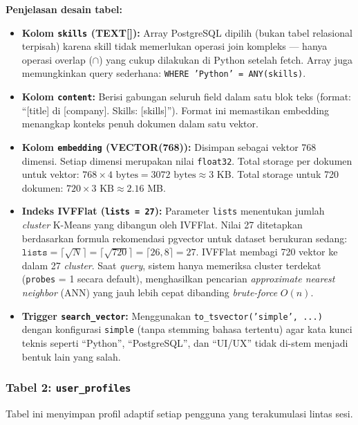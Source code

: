 \noindent \textbf{Penjelasan desain tabel:}
\begin{itemize}
  \item \textbf{Kolom \texttt{skills} (TEXT[]):} Array PostgreSQL dipilih (bukan tabel
    relasional terpisah) karena skill tidak memerlukan operasi join kompleks ---
    hanya operasi overlap ($\cap$) yang cukup dilakukan di Python setelah fetch.
    Array juga memungkinkan query sederhana: \texttt{WHERE 'Python' = ANY(skills)}.
  \item \textbf{Kolom \texttt{content}:} Berisi gabungan seluruh field dalam satu
    blok teks (format: ``[title] di [company]. Skills: [skills]'').
    Format ini memastikan embedding menangkap konteks penuh dokumen dalam satu vektor.
  \item \textbf{Kolom \texttt{embedding} (VECTOR(768)):} Disimpan sebagai vektor
    768 dimensi. Setiap dimensi merupakan nilai \texttt{float32}. Total storage per
    dokumen untuk vektor: $768 \times 4 \text{ bytes} = 3072 \text{ bytes} \approx 3$ KB.
    Total storage untuk 720 dokumen: $720 \times 3 \text{ KB} \approx 2.16$ MB.
  \item \textbf{Indeks IVFFlat (\texttt{lists = 27}):} Parameter \texttt{lists}
    menentukan jumlah \textit{cluster} K-Means yang dibangun oleh IVFFlat.
    Nilai 27 ditetapkan berdasarkan formula rekomendasi pgvector untuk dataset berukuran sedang:
    $\texttt{lists} = \lceil\sqrt{N}\rceil = \lceil\sqrt{720}\rceil = \lceil 26{,}8 \rceil = 27$.
    IVFFlat membagi 720 vektor ke dalam 27 \textit{cluster}. Saat \textit{query},
    sistem hanya memeriksa cluster terdekat (\texttt{probes} = 1 secara default),
    menghasilkan pencarian \textit{approximate nearest neighbor} (ANN) yang jauh lebih
    cepat dibanding \textit{brute-force} $O(n)$.
  \item \textbf{Trigger \texttt{search\_vector}:} Menggunakan \texttt{to\_tsvector('simple', ...)}
    dengan konfigurasi \texttt{simple} (tanpa stemming bahasa tertentu) agar kata kunci
    teknis seperti ``Python'', ``PostgreSQL'', dan ``UI/UX'' tidak di-stem menjadi
    bentuk lain yang salah.
\end{itemize}

\subsubsection{Tabel 2: \texttt{user\_profiles}}

Tabel ini menyimpan profil adaptif setiap pengguna yang terakumulasi lintas sesi.

